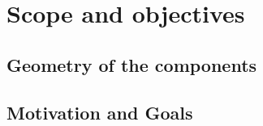 \section{Scope and objectives}

\subsection{Geometry of the components}

\newpage

\subsection{Motivation and Goals}

\newpage
